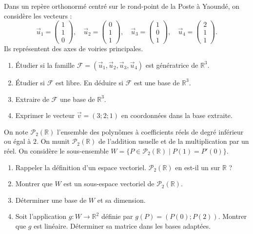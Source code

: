 \documentclass[11pt]{article}
\begin{document}
\begin{exercice}
Dans un repère orthonormé centré sur le rond-point de la Poste à Yaoundé, on considère les vecteurs :
$$\vec{u}_1 = \begin{pmatrix} 1 \\ 1 \\ 0 \end{pmatrix},\quad
\vec{u}_2 = \begin{pmatrix} 0 \\ 1 \\ 1 \end{pmatrix},\quad
\vec{u}_3 = \begin{pmatrix} 1 \\ 0 \\ 1 \end{pmatrix},\quad
\vec{u}_4 = \begin{pmatrix} 2 \\ 1 \\ 1 \end{pmatrix}.$$
Ils représentent des axes de voiries principales.
\begin{enumerate}
    \item Étudier si la famille $\mathcal{F} = (\vec{u}_1, \vec{u}_2, \vec{u}_3, \vec{u}_4)$ est génératrice de $\mathbb{R}^3$.
    \item Étudier si $\mathcal{F}$ est libre. En déduire si $\mathcal{F}$ est une base de $\mathbb{R}^3$.
    \item Extraire de $\mathcal{F}$ une base de $\mathbb{R}^3$.
    \item Exprimer le vecteur $\vec{v} = (3; 2; 1)$ en coordonnées dans la base extraite.
\end{enumerate}
\end{exercice}

\begin{exercice}
On note $\mathcal{P}_2(\mathbb{R})$ l'ensemble des polynômes à coefficients réels de degré inférieur ou égal à $2$. On munit $\mathcal{P}_2(\mathbb{R})$ de l'addition usuelle et de la multiplication par un réel.
On considère le sous-ensemble $W = \{ P \in \mathcal{P}_2(\mathbb{R}) \mid P(1) = P'(0) \}$.
\begin{enumerate}
    \item Rappeler la définition d'un espace vectoriel. $\mathcal{P}_2(\mathbb{R})$ en est-il un sur $\mathbb{R}$ ?
    \item Montrer que $W$ est un sous-espace vectoriel de $\mathcal{P}_2(\mathbb{R})$.
    \item Déterminer une base de $W$ et sa dimension.
    \item Soit l'application $g : W \to \mathbb{R}^2$ définie par $g(P) = (P(0); P(2))$. Montrer que $g$ est linéaire. Déterminer sa matrice dans les bases adaptées.
\end{enumerate}
\end{exercice}
\end{document}

